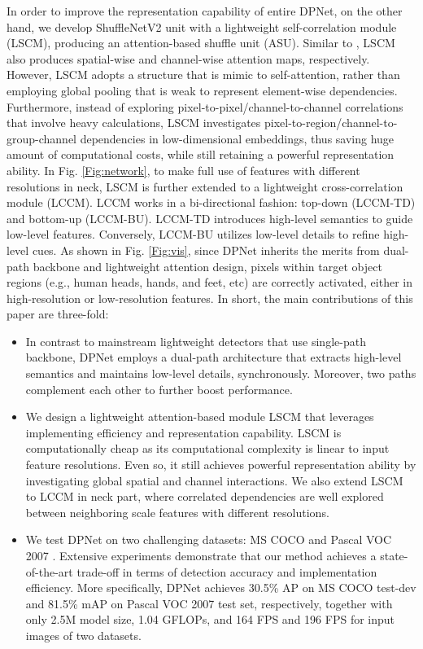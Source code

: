 \documentclass[lettersize,journal]{IEEEtran}
\begin{document}
In order to improve the representation capability of entire DPNet, on the other hand, we develop ShuffleNetV2 unit \cite{ma2018shufflenet} with a lightweight self-correlation module (LSCM), producing an attention-based shuffle unit (ASU). Similar to \cite{woo2018cbam,hu2018genet}, LSCM also produces spatial-wise and channel-wise attention maps, respectively. However, LSCM adopts a structure that is mimic to self-attention, rather than employing global pooling that is weak to represent element-wise dependencies. Furthermore, instead of exploring pixel-to-pixel/channel-to-channel correlations \cite{wang2018non,fu2019dual} that involve heavy calculations, LSCM investigates pixel-to-region/channel-to-group-channel dependencies in low-dimensional embeddings, thus saving huge amount of computational costs, while still retaining a powerful representation ability. In Fig. \ref{Fig:network}, to make full use of features with different resolutions in neck, LSCM is further extended to a lightweight cross-correlation module (LCCM). LCCM works in a bi-directional fashion: top-down (LCCM-TD) and bottom-up (LCCM-BU). LCCM-TD introduces high-level semantics to guide low-level features. Conversely, LCCM-BU utilizes low-level details to refine high-level cues. As shown in Fig. \ref{Fig:vis}, since DPNet inherits the merits from dual-path backbone and lightweight attention design, pixels within target object regions (e.g., human heads, hands, and feet, etc) are correctly activated, either in high-resolution or low-resolution features. In short, the main contributions of this paper are three-fold:
\begin{itemize}
	\item In contrast to mainstream lightweight detectors that use single-path backbone, DPNet employs a dual-path architecture that extracts high-level semantics and maintains low-level details, synchronously. Moreover, two paths complement each other to further boost performance. \item We design a lightweight attention-based module LSCM that leverages implementing efficiency and representation capability. LSCM is computationally cheap as its computational complexity is linear to input feature resolutions. Even so, it still achieves powerful representation ability by investigating global spatial and channel interactions. We also extend LSCM to LCCM in neck part, where correlated dependencies are well explored between neighboring scale features with different resolutions. 
	\item We test DPNet on two challenging datasets: MS COCO \cite{lin2014microsoft} and Pascal VOC 2007 \cite{everingham2010pascal}. Extensive experiments demonstrate that our method achieves a state-of-the-art trade-off in terms of detection accuracy and implementation efficiency. More specifically, DPNet achieves 30.5\% AP on MS COCO test-dev and 81.5\% mAP on Pascal VOC 2007 test set, respectively, together with only 2.5M model size, 1.04 GFLOPs, and 164 FPS and 196 FPS for  input images of two datasets.
\end{itemize}
\end{document}

